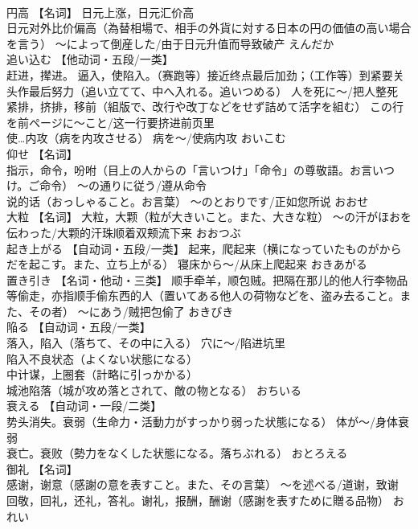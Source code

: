 \documentclass[8pt]{extreport}
\begin{document}
\begin{CJK}{UTF8}{min}
\\	円高	【名词】 日元上涨，日元汇价高
\\	日元对外比价偏高（為替相場で、相手の外貨に対する日本の円の価値の高い場合を言う） ～によって倒産した/由于日元升值而导致破产	えんだか	
\\	追い込む	【他动词・五段/一类】 
\\	赶进，撵进。 逼入，使陷入。（赛跑等）接近终点最后加劲；（工作等）到紧要关头作最后努力（追い立てて、中へ入れる。追いつめる） 人を死に～/把人整死 
\\	紧排，挤排，移前（組版で、改行や改丁などをせず詰めて活字を組む） この行を前ページに～こと/这一行要挤进前页里 
\\	使…内攻（病を内攻させる） 病を～/使病内攻	おいこむ	
\\	仰せ	【名词】 
\\	指示，命令，吩咐（目上の人からの「言いつけ」「命令」の尊敬語。お言いつけ。ご命令） ～の通りに従う/遵从命令 
\\	说的话（おっしゃること。お言葉） ～のとおりです/正如您所说	おおせ	
\\	大粒	【名词】 大粒，大颗（粒が大きいこと。また、大きな粒） ～の汗がほおを伝わった/大颗的汗珠顺着双颊流下来	おおつぶ	
\\	起き上がる	【自动词・五段/一类】 起来，爬起来（横になっていたものがからだを起こす。また、立ち上がる） 寝床から～/从床上爬起来	おきあがる	
\\	置き引き	【名词・他动・三类】 顺手牵羊，顺包贼。把隔在那儿的他人行李物品等偷走，亦指顺手偷东西的人（置いてある他人の荷物などを、盗み去ること。また、その者） ～にあう/贼把包偷了	おきびき	
\\	陥る	【自动词・五段/一类】 
\\	落入，陷入（落ちて、その中に入る） 穴に～/陷进坑里 
\\	陷入不良状态（よくない状態になる） 
\\	中计谋，上圈套（計略に引っかかる） 
\\	城池陷落（城が攻め落とされて、敵の物となる）	おちいる	
\\	衰える	【自动词・一段/二类】 
\\	势头消失。衰弱（生命力・活動力がすっかり弱った状態になる） 体が～/身体衰弱 
\\	衰亡。衰败（勢力をなくした状態になる。落ちぶれる）	おとろえる	
\\	御礼	【名词】 
\\	感谢，谢意（感謝の意を表すこと。また、その言葉） ～を述べる/道谢，致谢 
\\	回敬，回礼，还礼，答礼。谢礼，报酬，酬谢（感謝を表すために贈る品物）	おれい	

\end{CJK}
\end{document}
